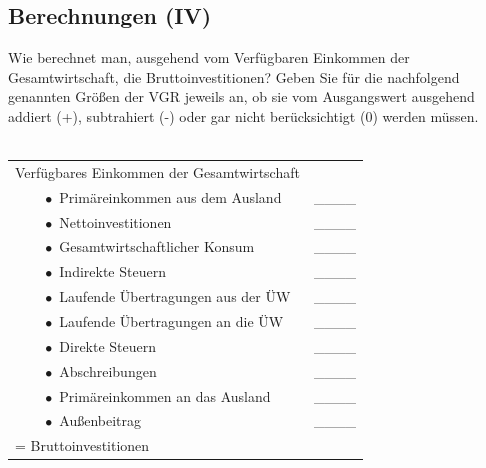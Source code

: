 \documentclass{scrartcl}
\begin{document}
\subsection{Berechnungen (IV)}
Wie berechnet man, ausgehend vom Verfügbaren Einkommen der Gesamtwirtschaft, die Bruttoinvestitionen? Geben Sie für die nachfolgend genannten Größen der VGR jeweils an, ob sie vom Ausgangswert ausgehend addiert (+), subtrahiert (-) oder gar nicht berücksichtigt (0) werden müssen.\\~\\
\begin{tabular}{ll}
	Verfügbares Einkommen der Gesamtwirtschaft& \\
	$\qquad\bullet$ Primäreinkommen aus dem Ausland &  \_\_\_\_ \\
	$\qquad\bullet$ Nettoinvestitionen &  \_\_\_\_ \\
	$\qquad\bullet$ Gesamtwirtschaftlicher Konsum &  \_\_\_\_ \\
	$\qquad\bullet$ Indirekte Steuern &  \_\_\_\_ \\
	$\qquad\bullet$ Laufende Übertragungen aus der ÜW &  \_\_\_\_ \\
	$\qquad\bullet$ Laufende Übertragungen an die ÜW &  \_\_\_\_ \\
	$\qquad\bullet$ Direkte Steuern &  \_\_\_\_ \\
	$\qquad\bullet$ Abschreibungen &  \_\_\_\_ \\
	$\qquad\bullet$ Primäreinkommen an das Ausland &  \_\_\_\_ \\
	$\qquad\bullet$ Außenbeitrag &  \_\_\_\_ \\
	= Bruttoinvestitionen  &
\end{tabular}
\newpage
\end{document}
